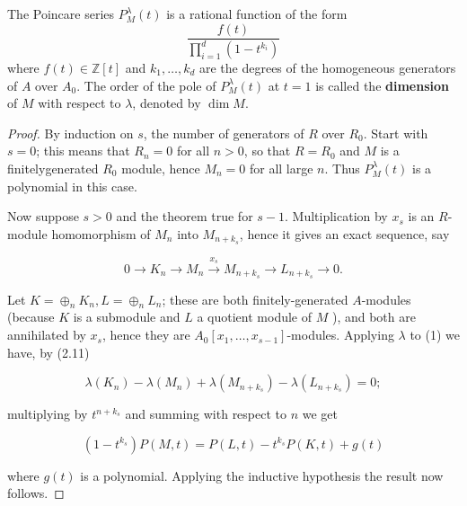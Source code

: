 \begin{theorem}
    The Poincare series $P_M^\lambda(t)$ is a rational function of the form
    \begin{equation*}
        \frac{f(t)}{\prod_{i=1}^d\left(1-t^{k_i}\right)}
    \end{equation*}
    where $f(t)\in \mathbb{Z}[t]$ and $k_1, \ldots, k_d$ are the degrees of the homogeneous generators of $A$ over $A_0$.
    The order of the pole of $P_M^\lambda(t)$ at $t=1$ is called the \textbf{dimension} of $M$ with respect to $\lambda$, denoted by $\dim M$.
    \begin{proof}
        By induction on $s$, the number of generators of $R$ over $R_0$. Start with $s=0$; this means that $R_n=0$ for all $n>0$, so that $R=R_0$ and $M$ is a finitelygenerated $R_0$ module, hence $M_n=0$ for all large $n$. Thus $P_M^\lambda(t)$ is a polynomial in this case.

        Now suppose $s>0$ and the theorem true for $s-1$. Multiplication by $x_s$ is an $R$-module homomorphism of $M_n$ into $M_{n+k_s}$, hence it gives an exact sequence, say

        \begin{equation*}
            0 \rightarrow K_n \rightarrow M_n \xrightarrow{x_s} M_{n+k_s} \rightarrow L_{n+k_s} \rightarrow 0 .
        \end{equation*}


        Let $K=\oplus_n K_n, L=\oplus_n L_n$; these are both finitely-generated $A$-modules (because $K$ is a submodule and $L$ a quotient module of $M$ ), and both are annihilated by $x_s$, hence they are $A_0\left[x_1, \ldots, x_{s-1}\right]$-modules. Applying $\lambda$ to (1) we have, by (2.11)

        \begin{equation*}
            \lambda\left(K_n\right)-\lambda\left(M_n\right)+\lambda\left(M_{n+k_s}\right)-\lambda\left(L_{n+k_s}\right)=0 ;
        \end{equation*}

        multiplying by $t^{n+k_s}$ and summing with respect to $n$ we get

        \begin{equation*}
            \left(1-t^{k_s}\right) P(M, t)=P(L, t)-t^{k_s} P(K, t)+g(t)
        \end{equation*}

        where $g(t)$ is a polynomial. Applying the inductive hypothesis the result now follows.
    \end{proof}
\end{theorem}

